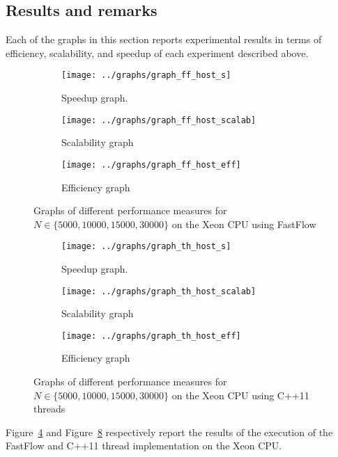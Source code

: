 \subsection{Results and remarks} \label{subsec:results}
Each of the graphs in this section reports experimental results in terms of efficiency, scalability, and speedup of each experiment described above.
\begin{figure}
	\centering
	\begin{subfigure}[b]{0.3\linewidth}
		\texttt{[image: ../graphs/graph\_ff\_host\_s]}
		\caption{Speedup graph.}
		\label{fig:ff_host_s}
	\end{subfigure}
	\begin{subfigure}[b]{0.3\linewidth}
		\texttt{[image: ../graphs/graph\_ff\_host\_scalab]}
		\caption{Scalability graph}
		\label{fig:ff_host_scalab}
	\end{subfigure}
	\begin{subfigure}[b]{0.3\linewidth}
		\texttt{[image: ../graphs/graph\_ff\_host\_eff]}
		\caption{Efficiency graph}
		\label{fig:ff_host_eff}
	\end{subfigure}
	\caption{Graphs of different performance measures for $N \in \{5000, 10000, 15000, 30000\}$ on the Xeon CPU using FastFlow}
	\label{fig:ff_host}
\end{figure}
\begin{figure}
	\centering
	\begin{subfigure}[b]{0.3\textwidth}
		\texttt{[image: ../graphs/graph\_th\_host\_s]}
		\caption{Speedup graph.}
		\label{fig:th_host_s}
	\end{subfigure}
	\begin{subfigure}[b]{0.3\textwidth}
		\texttt{[image: ../graphs/graph\_th\_host\_scalab]}
		\caption{Scalability graph}
		\label{fig:th_host_scalab}
	\end{subfigure}
	\begin{subfigure}[b]{0.3\textwidth}
		\texttt{[image: ../graphs/graph\_th\_host\_eff]}
		\caption{Efficiency graph}
		\label{fig:th_host_eff}
	\end{subfigure}
	\caption{Graphs of different performance measures for $N \in \{5000, 10000, 15000, 30000\}$ on the Xeon CPU using C++11 threads}
	\label{fig:th_host}
\end{figure}
Figure~\ref{fig:ff_host} and Figure~\ref{fig:th_host} respectively report the results of the execution of the FastFlow and C++11 thread implementation on the Xeon CPU.
